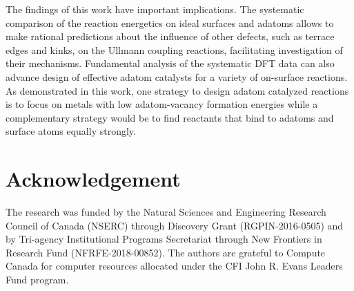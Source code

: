 \documentclass[aps,prb,reprint,amsmath,amssymb]{revtex4-1}
\begin{document}

The findings of this work have important implications. The systematic comparison of the reaction energetics on ideal surfaces and adatoms allows to make rational predictions about the influence of other defects, such as terrace edges and kinks, on the Ullmann coupling reactions, facilitating investigation of their mechanisms.
Fundamental analysis of the systematic DFT data can also advance design of effective adatom catalysts for a variety of on-surface reactions. As demonstrated in this work, one strategy to design adatom catalyzed reactions is to focus on metals with low adatom-vacancy formation energies while a complementary strategy would be to find reactants that bind to adatoms and surface atoms equally strongly. 


\section{Acknowledgement}

The research was funded by the Natural Sciences and Engineering Research Council of Canada (NSERC) through Discovery Grant (RGPIN-2016-0505) and by Tri-agency Institutional Programs Secretariat through New Frontiers in Research Fund (NFRFE-2018-00852). The authors are grateful to Compute Canada for computer resources allocated under the CFI John R. Evans Leaders Fund program.
\end{document}
